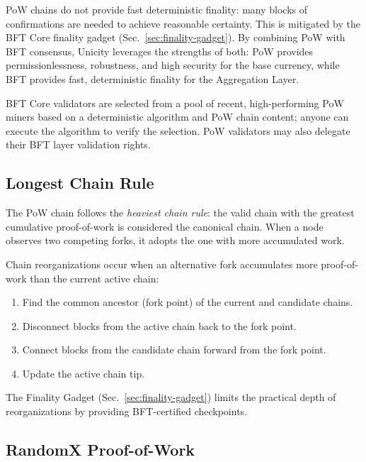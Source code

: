 PoW chains do not provide fast deterministic finality: many blocks of confirmations are needed to achieve reasonable certainty. This is mitigated by the BFT Core finality gadget (Sec.~\ref{sec:finality-gadget}). By combining PoW with BFT consensus, Unicity leverages the strengths of both: PoW provides permissionlessness, robustness, and high security for the base currency, while BFT provides fast, deterministic finality for the Aggregation Layer.

BFT Core validators are selected from a pool of recent, high-performing PoW miners based on a deterministic algorithm and PoW chain content; anyone can execute the algorithm to verify the selection. PoW validators may also delegate their BFT layer validation rights.


\subsection{Longest Chain Rule}\label{sec:longest-chain}

The PoW chain follows the \emph{heaviest chain rule}: the valid chain with the greatest cumulative proof-of-work is considered the canonical chain. When a node observes two competing forks, it adopts the one with more accumulated work.

Chain reorganizations occur when an alternative fork accumulates more proof-of-work than the current active chain:
\begin{enumerate}[nosep]
  \item Find the common ancestor (fork point) of the current and candidate chains.
  \item Disconnect blocks from the active chain back to the fork point.
  \item Connect blocks from the candidate chain forward from the fork point.
  \item Update the active chain tip.
\end{enumerate}

The Finality Gadget (Sec.~\ref{sec:finality-gadget}) limits the practical depth of reorganizations by providing BFT-certified checkpoints.


\subsection{RandomX Proof-of-Work}\label{sec:pow-randomx}

